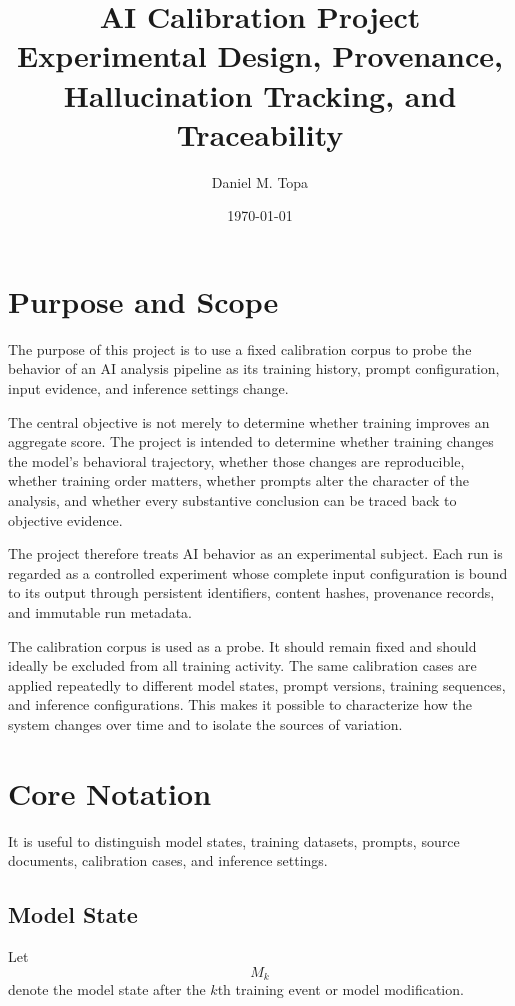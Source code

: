 \documentclass[11pt]{report}
\title{\textbf{AI Calibration Project}\\
\large Experimental Design, Provenance, Hallucination Tracking, and Traceability}
\author{Daniel M. Topa}
\date{\today}
\begin{document}
\maketitle
\tableofcontents

\chapter{Purpose and Scope}

The purpose of this project is to use a fixed calibration corpus to probe the behavior of an AI analysis pipeline as its training history, prompt configuration, input evidence, and inference settings change.

The central objective is not merely to determine whether training improves an aggregate score. The project is intended to determine whether training changes the model's behavioral trajectory, whether those changes are reproducible, whether training order matters, whether prompts alter the character of the analysis, and whether every substantive conclusion can be traced back to objective evidence.

The project therefore treats AI behavior as an experimental subject. Each run is regarded as a controlled experiment whose complete input configuration is bound to its output through persistent identifiers, content hashes, provenance records, and immutable run metadata.

The calibration corpus is used as a probe. It should remain fixed and should ideally be excluded from all training activity. The same calibration cases are applied repeatedly to different model states, prompt versions, training sequences, and inference configurations. This makes it possible to characterize how the system changes over time and to isolate the sources of variation.

\chapter{Core Notation}

It is useful to distinguish model states, training datasets, prompts, source documents, calibration cases, and inference settings.

\section{Model State}

Let
\[
M_k
\]
denote the model state after the $k$th training event or model modification.
\end{document}
